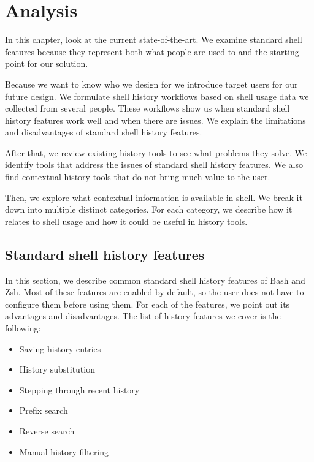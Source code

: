 
\chapter{Analysis}

In this chapter, look at the current state-of-the-art. 
We examine standard shell features because they represent both what people are used to and the starting point for our solution.

Because we want to know who we design for we introduce target users for our future design. We formulate shell history workflows based on shell usage data we collected from several people. %
These workflows show us when standard shell history features work well and when there are issues. We explain the limitations and disadvantages of standard shell history features.

After that, we review existing history tools to see what problems they solve. We identify tools that address the issues of standard shell history features. We also find contextual history tools that do not bring much value to the user.

Then, we explore what contextual information is available in shell. We break it down into multiple distinct categories. For each category, we describe how it relates to shell usage and how it could be useful in history tools.


\section{Standard shell history features}

In this section, we describe common standard shell history features of Bash\cite{bashman} and Zsh\cite{zshdocs}. Most of these features are enabled by default, so the user does not have to configure them before using them.
For each of the features, we point out its advantages and disadvantages.
The list of history features we cover is the following:

\begin{itemize}
    \item Saving history entries
    \item History substitution
    \item Stepping through recent history
    \item Prefix search
    \item Reverse search
    \item Manual history filtering
\end{itemize}


